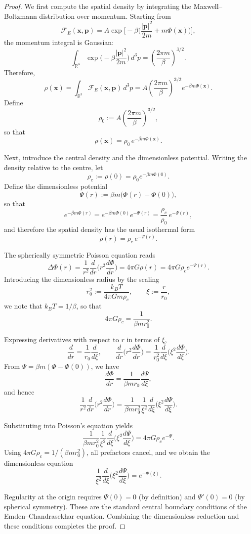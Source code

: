 \documentclass[12pt,a4paper]{article}
\numberwithin{equation}{section}
\begin{document}
\begin{proof}
We first compute the spatial density by integrating the Maxwell--Boltzmann distribution over momentum. Starting from
\[
\mathcal{F}_E(\mathbf{x},\mathbf{p}) = A \exp\!\Big[-\beta\Big(\frac{|\mathbf{p}|^2}{2m}+m\Phi(\mathbf{x})\Big)\Big],
\]
the momentum integral is Gaussian:
\[
\int_{\mathbb{R}^3} \exp\!\Big(-\beta\frac{|\mathbf{p}|^2}{2m}\Big)\,d^3p
= \left(\frac{2\pi m}{\beta}\right)^{3/2}.
\]
Therefore,
\[
\rho(\mathbf{x}) = \int_{\mathbb{R}^3} \mathcal{F}_E(\mathbf{x},\mathbf{p})\,d^3p
= A\left(\frac{2\pi m}{\beta}\right)^{3/2} e^{-\beta m \Phi(\mathbf{x})}.
\]
Define
\[
\rho_0 := A\left(\frac{2\pi m}{\beta}\right)^{3/2},
\]
so that
\[
\rho(\mathbf{x}) = \rho_0 \, e^{-\beta m \Phi(\mathbf{x})}.
\]

Next, introduce the central density and the dimensionless potential. Writing the density relative to the centre, let
\[
\rho_c := \rho(0) = \rho_0 e^{-\beta m \Phi(0)}.
\]
Define the dimensionless potential
\[
\Psi(r) := \beta m\big(\Phi(r)-\Phi(0)\big),
\]
so that
\[
e^{-\beta m \Phi(r)} = e^{-\beta m \Phi(0)} e^{-\Psi(r)} = \frac{\rho_c}{\rho_0}\, e^{-\Psi(r)},
\]
and therefore the spatial density has the usual isothermal form
\[
\rho(r) = \rho_c \, e^{-\Psi(r)}.
\]

The spherically symmetric Poisson equation reads
\[
\Delta\Phi(r) = \frac{1}{r^2}\frac{d}{dr}\!\Big(r^2\frac{d\Phi}{dr}\Big)
= 4\pi G \rho(r) = 4\pi G \rho_c e^{-\Psi(r)}.
\]
Introducing the dimensionless radius by the scaling
\[
r_0^2 := \frac{k_B T}{4\pi G m \rho_c},
\qquad \xi := \frac{r}{r_0},
\]
we note that \(k_B T = 1/\beta\), so that
\[
4\pi G \rho_c = \frac{1}{\beta m r_0^2}.
\]

Expressing derivatives with respect to \(r\) in terms of \(\xi\),
\[
\frac{d}{dr} = \frac{1}{r_0}\frac{d}{d\xi}, \qquad
\frac{d}{dr}\!\Big(r^2\frac{d\Phi}{dr}\Big)
= \frac{1}{r_0^2}\frac{d}{d\xi}\!\Big(\xi^2\frac{d\Phi}{d\xi}\Big).
\]
From \(\Psi = \beta m(\Phi-\Phi(0))\), we have
\[
\frac{d\Phi}{dr} = \frac{1}{\beta m r_0}\frac{d\Psi}{d\xi},
\]
and hence
\[
\frac{1}{r^2}\frac{d}{dr}\!\Big(r^2\frac{d\Phi}{dr}\Big)
= \frac{1}{\beta m r_0^2}\frac{1}{\xi^2}\frac{d}{d\xi}\!\Big(\xi^2\frac{d\Psi}{d\xi}\Big).
\]

Substituting into Poisson’s equation yields
\[
\frac{1}{\beta m r_0^2}\frac{1}{\xi^2}\frac{d}{d\xi}\!\Big(\xi^2\frac{d\Psi}{d\xi}\Big)
= 4\pi G \rho_c e^{-\Psi}.
\]
Using \(4\pi G \rho_c = 1/(\beta m r_0^2)\), all prefactors cancel, and we obtain the dimensionless equation
\[
\frac{1}{\xi^2}\frac{d}{d\xi}\!\Big(\xi^2\frac{d\Psi}{d\xi}\Big) = e^{-\Psi(\xi)}.
\]

Regularity at the origin requires \(\Psi(0)=0\) (by definition) and \(\Psi'(0)=0\) (by spherical symmetry). These are the standard central boundary conditions of the Emden--Chandrasekhar equation. Combining the dimensionless reduction and these conditions completes the proof.
\end{proof}
\end{document}
